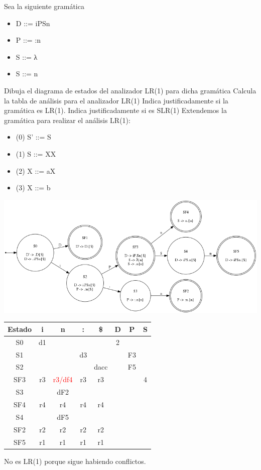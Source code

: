 \begin{problem}
Sea la siguiente gramática

\begin{itemize}
\item D ::= iPSn
\item P ::= :n
\item S ::= λ
\item S ::= n
\end{itemize}

\ppart Dibuja el diagrama de estados del analizador LR(1) para dicha gramática
\ppart Calcula la tabla de análisis para el analizador LR(1)
\ppart Indica justificadamente si la gramática es LR(1). Indica justificadamente si es SLR(1)
\solution
\ppart Extendemos la gramática para realizar el análisis LR(1):

\begin{itemize}
\item (0) S' ::= S
\item (1) S ::= XX
\item (2) X ::= aX
\item (3) X ::= b
\end{itemize}
\begin{center}
\includegraphics[scale=0.65]{tex/ejerciciosHoja3/automata10.png}
\end{center}

\ppart
\begin{tabular}{| c | c | c | c | c | c | c | c | }
\hline
Estado & i & n & : & \$ & D & P & S\\
\hline
S0 & d1 & &  &  & 2 &  & \\
\hline
S1 &  &  & d3 &  &  & F3 & \\
\hline
S2 &  &  &  & dacc &  & F5 &\\
\hline
SF3 & r3 & \textcolor{red}{r3/df4} & r3 & r3 &  &  & 4\\
\hline
S3 &  & dF2 & &  &  &  & \\
\hline
SF4 & r4  & r4  & r4 & r4 & &  &\\
\hline
S4 &  & dF5 &  &  &  &  & \\
\hline
SF2 & r2 & r2 & r2 & r2 &  &  & \\
\hline
SF5 & r1 & r1 & r1 & r1 &  &  & \\
\hline
\end{tabular}


\ppart
No es LR(1) porque sigue habiendo conflictos.
\end{problem}
